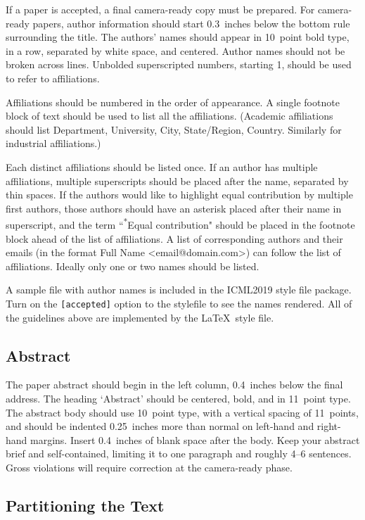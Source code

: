 \documentclass{article}
\begin{document}
If a paper is accepted, a final camera-ready copy must be prepared.
%
For camera-ready papers, author information should start 0.3~inches below the
bottom rule surrounding the title. The authors' names should appear in 10~point
bold type, in a row, separated by white space, and centered. Author names should
not be broken across lines. Unbolded superscripted numbers, starting 1, should
be used to refer to affiliations.

Affiliations should be numbered in the order of appearance. A single footnote
block of text should be used to list all the affiliations. (Academic
affiliations should list Department, University, City, State/Region, Country.
Similarly for industrial affiliations.)

Each distinct affiliations should be listed once. If an author has multiple
affiliations, multiple superscripts should be placed after the name, separated
by thin spaces. If the authors would like to highlight equal contribution by
multiple first authors, those authors should have an asterisk placed after their
name in superscript, and the term ``\textsuperscript{*}Equal contribution"
should be placed in the footnote block ahead of the list of affiliations. A
list of corresponding authors and their emails (in the format Full Name
\textless{}email@domain.com\textgreater{}) can follow the list of affiliations.
Ideally only one or two names should be listed.

A sample file with author names is included in the ICML2019 style file
package. Turn on the \texttt{[accepted]} option to the stylefile to
see the names rendered. All of the guidelines above are implemented
by the \LaTeX\ style file.

\subsection{Abstract}

The paper abstract should begin in the left column, 0.4~inches below the final
address. The heading `Abstract' should be centered, bold, and in 11~point type.
The abstract body should use 10~point type, with a vertical spacing of
11~points, and should be indented 0.25~inches more than normal on left-hand and
right-hand margins. Insert 0.4~inches of blank space after the body. Keep your
abstract brief and self-contained, limiting it to one paragraph and roughly 4--6
sentences. Gross violations will require correction at the camera-ready phase.

\subsection{Partitioning the Text}
\end{document}
